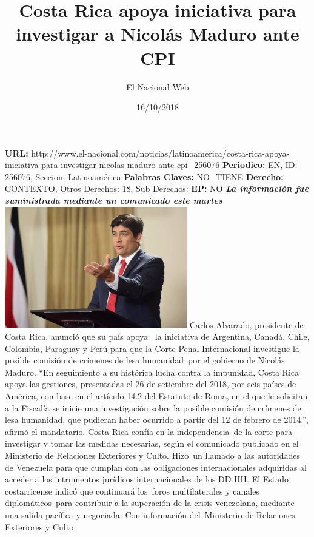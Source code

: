 \documentclass{article}%
\title{\textbf{Costa Rica apoya iniciativa para investigar a Nicolás Maduro ante CPI}}%
\author{El Nacional Web}%
\date{16/10/2018}%
\begin{document}
%
\normalsize%
\maketitle%
\textbf{URL: }%
http://www.el{-}nacional.com/noticias/latinoamerica/costa{-}rica{-}apoya{-}iniciativa{-}para{-}investigar{-}nicolas{-}maduro{-}ante{-}cpi\_256076\newline%
%
\textbf{Periodico: }%
EN, %
ID: %
256076, %
Seccion: %
Latinoamérica\newline%
%
\textbf{Palabras Claves: }%
NO\_TIENE\newline%
%
\textbf{Derecho: }%
CONTEXTO, %
Otros Derechos: %
18, %
Sub Derechos: %
\newline%
%
\textbf{EP: }%
NO\newline%
\newline%
%
\textbf{\textit{La información fue suministrada mediante un comunicado este martes}}%
\newline%
\newline%
%
\includegraphics[width=300px]{104.jpg}%
\newline%
%
Carlos Alvarado, presidente de Costa Rica, anunció que su país apoya~ la iniciativa de Argentina, Canadá, Chile, Colombia, Paraguay y Perú para que la Corte Penal Internacional investigue la posible comisión de crímenes de lesa humanidad~por el gobierno de Nicolás Maduro.%
\newline%
%
“En seguimiento a su histórica lucha contra la impunidad, Costa Rica apoya las gestiones, presentadas el 26 de setiembre del 2018, por seis países de América, con base en el artículo 14.2 del Estatuto de Roma, en el que le solicitan a la Fiscalía se inicie una investigación sobre la posible comisión de crímenes de lesa humanidad, que pudieran haber ocurrido a partir del 12 de febrero de 2014.”, afirmó el mandatario.%
\newline%
%
Costa Rica confía en la independencia~de la corte para investigar y tomar las medidas necesarias, según el comunicado publicado en el Ministerio de Relaciones Exteriores y Culto.%
\newline%
%
Hizo~un llamado a las autoridades de Venezuela para que cumplan con las obligaciones internacionales adquiridas al acceder a los intrumentos jurídicos internacionales de los DD HH.%
\newline%
%
El Estado costarricense indicó que continuará los~foros multilaterales y canales diplomáticos~para contribuir a la superación de la crisis venezolana, mediante una salida pacífica y negociada.%
\newline%
%
Con información del~Ministerio de Relaciones Exteriores y Culto%
\newline%
%
\end{document}
